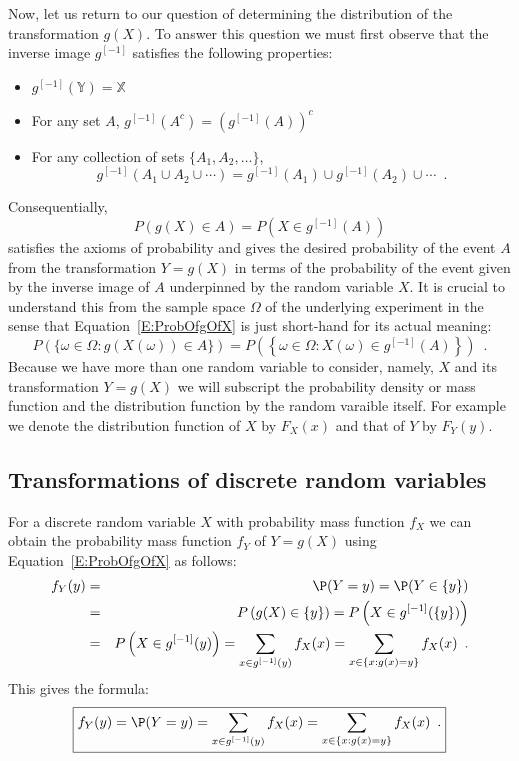 Now, let us return to our question of determining the distribution of the transformation $g(X)$.  To answer this question we must first observe that the inverse image $g^{[-1]}$ satisfies the following properties:
\begin{itemize}
\item $g^{[-1]}(\mathbb{Y}) = \mathbb{X}$
\item For any set $A$, $g^{[-1]}(A^c) = \left(g^{[-1]}(A)\right)^c$
\item For any collection of sets $\{A_1,A_2,\ldots\}$,
\[
g^{[-1]}\left( A_1 \cup A_2 \cup \cdots \right) = g^{[-1]}(A_1) \cup g^{[-1]}(A_2) \cup \cdots \enspace.
\]
\end{itemize}
Consequentially, 
\begin{equation}\label{E:ProbOfgOfX}
\boxed{P \left( g(X) \in A \right) = P \left(X \in g^{[-1]}(A) \right)}
\end{equation} 
satisfies the axioms of probability and gives the desired probability of the event $A$ from the transformation $Y=g(X)$ in terms of the probability of the event given by the inverse image of $A$ underpinned by the random variable $X$.  
It is crucial to understand this from the sample space $\Omega$ of the underlying experiment in the sense that Equation~\eqref{E:ProbOfgOfX} is just short-hand for its actual meaning:
\[
P \left( \{\omega \in \Omega: g(X(\omega)) \in A\} \right) 
= P \left( \left\{ \omega \in \Omega: X(\omega) \in g^{[-1]}(A) \right\} \right) \enspace .
\]
Because we have more than one random variable to consider, namely, $X$ and its transformation $Y=g(X)$ we will subscript the probability density or mass function and the distribution function by the random varaible itself.  For example we denote the distribution function of $X$ by $F_X(x)$ and that of $Y$ by $F_Y(y)$.

\subsection{Transformations of discrete random variables}\label{TransformationsOFDiscreteRvs}
For a discrete random variable $X$ with probability mass function $f_X$ we can obtain the probability mass function $f_Y$ of $Y=g(X)$ using Equation~\eqref{E:ProbOfgOfX} as follows:
\begin{eqnarray*}
f_Y(y) 
&=& \P(Y =y) = \P(Y \in \{y\}) \\
&=& P \left( g(X) \in \{y\} \right) = P \left(X \in g^{[-1]}(\{y\}) \right)\\
&=& P \left(X \in g^{[-1]}(y) \right) = \sum_{x \in g^{[-1]}(y)} f_X(x) = \sum_{x \in \{x: g(x)=y\}} f_X(x) \enspace .
\end{eqnarray*}
This gives the formula:
\begin{equation}\label{E:PMFOfgOfX}
\boxed{
f_Y(y) = \P(Y =y) = \sum_{x \in g^{[-1]}(y)} f_X(x) = \sum_{x \in \{x: g(x)=y\}} f_X(x) \enspace .
}
\end{equation}


